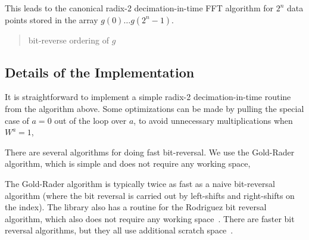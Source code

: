 \documentclass[fleqn,12pt]{article}
\newenvironment{algorithm}{\begin{quote} %
\begin{algorithmic}\samepage}{\end{algorithmic} %
\end{quote}}
\begin{document}
This leads to the canonical radix-2 decimation-in-time FFT algorithm
for $2^n$ data points stored in the array $g(0) \dots g(2^n-1)$.
%
\begin{algorithm}
\STATE bit-reverse ordering of $g$
    \ENDFOR
  \ENDFOR
  \STATE{$\Delta \Leftarrow 2\Delta$}
\ENDFOR
\end{algorithm}
%
%
\subsection{Details of the Implementation}
It is straightforward to implement a simple radix-2 decimation-in-time
routine from the algorithm above. Some optimizations can be made by
pulling the special case of $a=0$ out of the loop over $a$, to avoid
unnecessary multiplications when $W^a=1$,
%
\begin{algorithm}
    \ENDFOR
\end{algorithm}
%
There are several algorithms for doing fast bit-reversal. We use the
Gold-Rader algorithm, which is simple and does not require any working
space,
%
\begin{algorithm}
        \ENDIF

        \ENDWHILE
      
\ENDFOR
\end{algorithm}
%
The Gold-Rader algorithm is typically twice as fast as a naive
bit-reversal algorithm (where the bit reversal is carried out by
left-shifts and right-shifts on the index).  The library also has a
routine for the Rodriguez bit reversal algorithm, which also does not
require any working space~\cite{rodriguez89}. There are faster bit
reversal algorithms, but they all use additional scratch
space~\cite{rosel89}.
\end{document}
